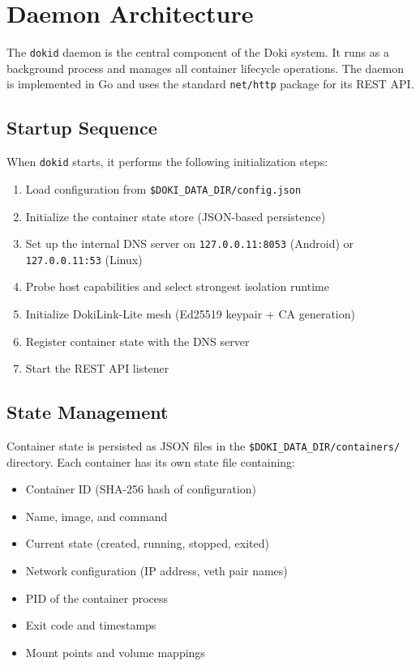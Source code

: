 \section{Daemon Architecture}
\label{sec:daemon}

The \texttt{dokid} daemon is the central component of the Doki system.
It runs as a background process and manages all container lifecycle
operations. The daemon is implemented in Go and uses the standard
\texttt{net/http} package for its REST API.

\subsection{Startup Sequence}
\label{sec:startup-sequence}

When \texttt{dokid} starts, it performs the following initialization
steps:

\begin{enumerate}[leftmargin=*, itemsep=3pt]
  \item Load configuration from \texttt{\$DOKI\_DATA\_DIR/config.json}
  \item Initialize the container state store (JSON-based persistence)
  \item Set up the internal DNS server on \texttt{127.0.0.11:8053}
        (Android) or \texttt{127.0.0.11:53} (Linux)
  \item Probe host capabilities and select strongest isolation runtime
  \item Initialize DokiLink-Lite mesh (Ed25519 keypair + CA generation)
  \item Register container state with the DNS server
  \item Start the REST API listener
\end{enumerate}

\subsection{State Management}
\label{sec:state-management}

Container state is persisted as JSON files in the
\texttt{\$DOKI\_DATA\_DIR/containers/} directory. Each container has
its own state file containing:

\begin{itemize}[leftmargin=*, itemsep=2pt]
  \item Container ID (SHA-256 hash of configuration)
  \item Name, image, and command
  \item Current state (created, running, stopped, exited)
  \item Network configuration (IP address, veth pair names)
  \item PID of the container process
  \item Exit code and timestamps
  \item Mount points and volume mappings
\end{itemize}

